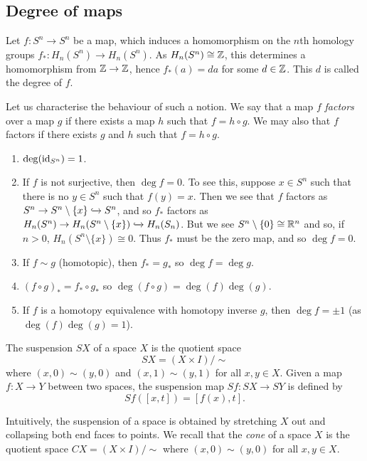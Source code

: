 \subsection{Degree of maps}

\begin{definition}
  Let $f: S^n \to S^n$ be a map, which induces a homomorphism on the $n$th homology groups $f_*: H_n(S^n) \to H_n(S^n)$. As $H_n(S^n) \cong \mathbb{Z}$, this determines a homomorphism from $\mathbb{Z} \to \mathbb{Z}$, hence $f_*(a) = da$ for some $d \in \mathbb{Z}$. This $d$ is called the degree of $f$.
\end{definition}

Let us characterise the behaviour of such a notion. We say that a map $f$ \emph{factors} over a map $g$ if there exists a map $h$ such that $f = h \circ g$. We may also that $f$ factors if there exists $g$ and $h$ such that $f = h \circ g$.
\begin{enumerate}
  \item $\deg(\operatorname{id}_{S^n}) = 1$.
  \item If $f$ is not surjective, then $\deg f = 0$. To see this, suppose $x \in S^n$ such that there is no $y \in S^n$ such that $f(y) = x$. Then we see that $f$ factors as $S^n \to S^n \setminus \{x\} \xhookrightarrow{} S^n$, and so $f_*$ factors as $H_n(S^n) \to H_n(S^n \setminus \{x\}) \xhookrightarrow{} H_n(S_n)$. But we see $S^n \setminus \{0\} \cong \mathbb{R}^{n}$ and so, if $n > 0$, $H_n(S^n \setminus \{x\}) \cong 0$. Thus $f_*$ must be the zero map, and so $\deg f = 0$.
  \item If $f \sim g$ (homotopic), then $f_* = g_*$ so $\deg f = \deg g$.
  \item $(f \circ g)_* = f_* \circ g_*$ so $\deg(f \circ g) = \deg(f) \deg(g)$.
  \item If $f$ is a homotopy equivalence with homotopy inverse $g$, then $\deg f = \pm 1$ (as $\deg(f)\deg(g) = 1$).
\end{enumerate}

\begin{definition}[Suspension]
  The suspension $SX$ of a space $X$ is the quotient space
  \[SX = (X \times I)/{\sim}\]
  where $(x,0) \sim (y,0)$ and $(x,1) \sim (y,1)$ for all $x, y \in X$. Given a map $f:X \to Y$ between two spaces, the suspension map $Sf: SX \to SY$ is defined by
  \[Sf([x, t]) = [f(x), t].\]
\end{definition}

Intuitively, the suspension of a space is obtained by stretching $X$ out and collapsing both end faces to points. We recall that the \emph{cone} of a space $X$ is the quotient space $CX = (X \times I)/{\sim}$ where $(x,0) \sim (y,0)$ for all $x,y \in X$.

